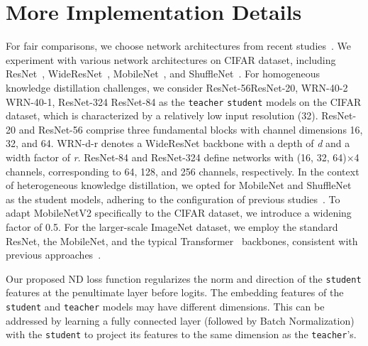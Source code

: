 \documentclass{article}
\begin{document}




\clearpage
\appendix
\newpage



\section{More Implementation Details}
For fair comparisons, we choose network architectures from recent studies~\cite{heo2019comprehensive, tian2019contrastive, chen2021distilling, zhao2022decoupled, huang2022knowledge}. We experiment with various network architectures on CIFAR dataset, including ResNet~\cite{he2016deep}, WideResNet~\cite{zagoruyko2016wide}, MobileNet~\cite{sandler2018mobilenetv2}, and ShuffleNet~\cite{Zhang_2018_CVPR, ma2018shufflenet}.
For homogeneous knowledge distillation challenges, we consider ResNet-56ResNet-20, WRN-40-2  WRN-40-1, ResNet-324  ResNet-84 as the {\tt teacher}  {\tt student} models on the CIFAR dataset, which is characterized by a relatively low input resolution (32). ResNet-20 and ResNet-56 comprise three fundamental blocks with channel dimensions 16, 32, and 64. WRN-d-r denotes a WideResNet backbone with a depth of \textit{d} and a width factor of \textit{r}. ResNet-84 and ResNet-324 define networks with (16, 32, 64)×4 channels, corresponding to 64, 128, and 256 channels, respectively. In the context of heterogeneous knowledge distillation, we opted for MobileNet and ShuffleNet as the student models, adhering to the configuration of previous studies~\cite{tian2019contrastive, chen2021distilling}. To adapt MobileNetV2 specifically to the CIFAR dataset, we introduce a widening factor of 0.5. For the larger-scale ImageNet dataset, we employ the standard ResNet, the MobileNet, and the typical Transformer~\cite{dosovitskiy2020image} backbones, consistent with previous approaches~\cite{heo2019comprehensive, tian2019contrastive, chen2021distilling, zhao2022decoupled, huang2022knowledge}.

Our proposed ND loss function regularizes the norm and direction of the {\tt student} features at the penultimate layer before logits. The embedding features of the  {\tt student} and {\tt teacher} models may have different dimensions. This can be addressed by learning a fully connected layer (followed by Batch Normalization) with the {\tt student} to project its features to the same dimension as the {\tt teacher}'s.
\end{document}
